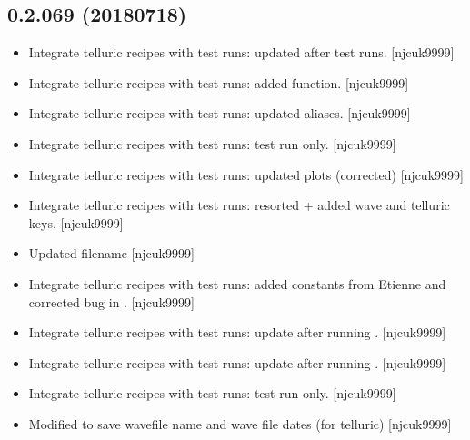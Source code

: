 \documentclass[a4paper,10pt,english]{report}
\begin{document}
\subsection{0.2.069 (2018\sphinxhyphen{}07\sphinxhyphen{}18)}
\label{\detokenize{misc/changelog:id407}}\begin{itemize}
\item {} 
Integrate telluric recipes with test runs: updated after test runs.
{[}njcuk9999{]}

\item {} 
Integrate telluric recipes with test runs: added 
function. {[}njcuk9999{]}

\item {} 
Integrate telluric recipes with test runs: updated aliases.
{[}njcuk9999{]}

\item {} 
Integrate telluric recipes with test runs: test run only. {[}njcuk9999{]}

\item {} 
Integrate telluric recipes with test runs: updated plots (corrected)
{[}njcuk9999{]}

\item {} 
Integrate telluric recipes with test runs: resorted  + added
wave and telluric keys. {[}njcuk9999{]}

\item {} 
Updated filename  {[}njcuk9999{]}

\item {} 
Integrate telluric recipes with test runs: added constants from
Etienne and corrected bug in . {[}njcuk9999{]}

\item {} 
Integrate telluric recipes with test runs: update after running
. {[}njcuk9999{]}

\item {} 
Integrate telluric recipes with test runs: update after running
. {[}njcuk9999{]}

\item {} 
Integrate telluric recipes with test runs: test run only. {[}njcuk9999{]}

\item {} 
Modified  to save wavefile name and wave file dates (for
telluric) {[}njcuk9999{]}

\end{itemize}
\end{document}
